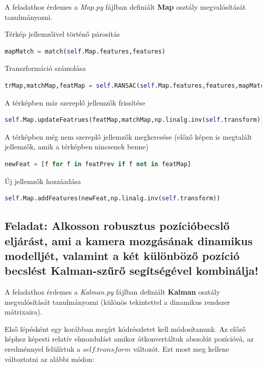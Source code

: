 \documentclass[12pt,a4paper,oneside]{report}             %
\begin{document}
A feladathoz érdemes a \emph{Map.py} fájlban definiált \textbf{Map} osztály megvalósítását tanulmányozni.

Térkép jellemzőivel történő párosítás

\begin{lstlisting}[language=Python]
mapMatch = match(self.Map.features,features)
\end{lstlisting}

Transzformáció számolása
\begin{lstlisting}[language=Python]
trMap,matchMap,featMap = self.RANSAC(self.Map.features,features,mapMatch)
\end{lstlisting}

A térképben már szereplő jellemzők frissítése

\begin{lstlisting}[language=Python]
self.Map.updateFeatrues(featMap,matchMap,np.linalg.inv(self.transform))
\end{lstlisting}

A térképben még nem szereplő jellemzők megkeresése (előző képen is megtalált jellemzők, amik a térképben nincsenek benne)

\begin{lstlisting}[language=Python]
newFeat = [f for f in featPrev if f not in featMap]
\end{lstlisting}

Új jellemzők hozzáadása

\begin{lstlisting}[language=Python]
self.Map.addFeatures(newFeat,np.linalg.inv(self.transform))
\end{lstlisting}

\subsection{Feladat: Alkosson robusztus pozícióbecslő eljárást, ami a kamera mozgásának dinamikus modelljét, valamint a két különböző pozíció becslést Kalman-szűrő segítségével kombinálja!}

A feladathoz érdemes a \emph{Kalman.py} fájlban definiált \textbf{Kalman} osztály megvalósítását tanulmányozni (különös tekintettel a dinamikus rendszer mátrixaira).

Első lépésként egy korábban megírt kódrészletet kell módosítanunk. Az előző képhez képesti relatív elmozdulást amikor átkonvertáltuk abszolút pozícióvá, az eredménnyel felülírtuk a $self.transform$ változót. Ezt most meg kellene változtatni az alábbi módon:
\end{document}

